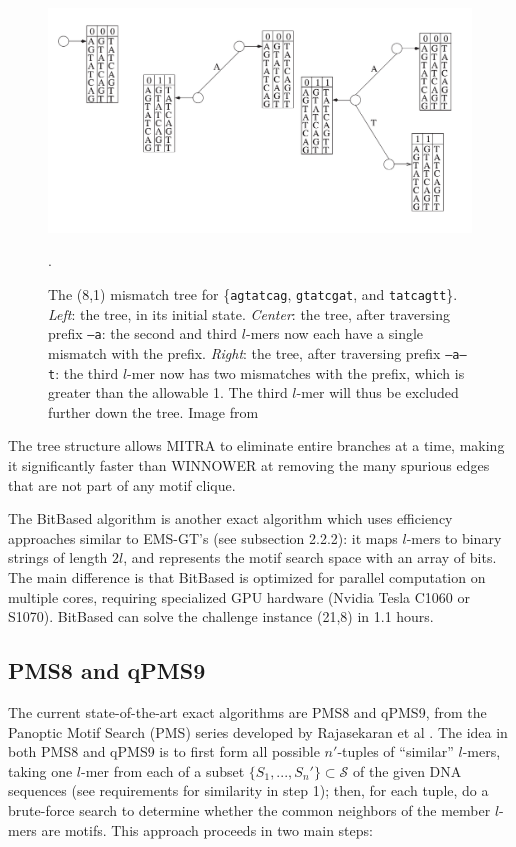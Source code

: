 \documentclass[oneside,12pt]{DISCSthesis}
\begin{document}
		\begin{figure}[h] \label{fig:mitra}
			\includegraphics[width=6.0in]{img/mitra}
			\caption[Example mismatch tree for MITRA.]{The (8,1) mismatch tree for \{\texttt{agtatcag}, \texttt{gtatcgat}, and \texttt{tatcagtt}\}. {\em Left}: the tree, in its initial state. {\em Center}: the tree, after traversing prefix \texttt{--a}: the second and third $l$-mers now each have a single mismatch with the prefix. {\em Right}: the tree, after traversing prefix \texttt{--a--t}: the third $l$-mer now has two mismatches with the prefix, which is greater than the allowable 1. The third $l$-mer will thus be excluded further down the tree. Image from \cite{eskin2002finding}}.
			\end{figure}

		\noindent The tree structure allows MITRA to eliminate entire branches at a time, making it significantly faster than WINNOWER at removing the many spurious edges that are not part of any motif clique.

		The BitBased algorithm \cite{dasari2010efficient} is another exact algorithm which uses efficiency approaches similar to EMS-GT's (see subsection 2.2.2): it maps $l$-mers to binary strings of length $2l$, and represents the motif search space with an array of bits. The main difference is that BitBased is optimized for parallel computation on multiple cores, requiring specialized GPU hardware (Nvidia Tesla C1060 or S1070). BitBased can solve the challenge instance (21,8) in 1.1 hours.

	\subsection{PMS8 and qPMS9}
		The current state-of-the-art exact algorithms are PMS8 and qPMS9, from the Panoptic Motif Search (PMS) series
		 developed by Rajasekaran et al
		\cite{pms2007,pms2014,pms2015}. The idea in both PMS8 and qPMS9 is to first form all possible $n'$-tuples of ``similar'' $l$-mers, taking one $l$-mer from each of a subset $\{S_1,...,S_n'\} \subset \mathcal{S}$ of the given DNA sequences (see requirements for similarity in step 1); then, for each tuple, do a brute-force search to determine whether the common neighbors of the member $l$-mers are motifs. This approach proceeds in two main steps:
\end{document}
